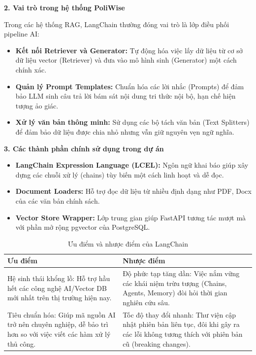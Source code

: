 \documentclass[12pt,a4paper]{report}
\begin{document}
\textbf{2. Vai trò trong hệ thống PoliWise}

Trong các hệ thống RAG, LangChain thường đóng vai trò là lớp điều phối pipeline AI:
\begin{itemize}
    \item \textbf{Kết nối Retriever và Generator:} Tự động hóa việc lấy dữ liệu từ cơ sở dữ liệu vector (Retriever) và đưa vào mô hình sinh (Generator) một cách chính xác.
    \item \textbf{Quản lý Prompt Templates:} Chuẩn hóa các lời nhắc (Prompts) để đảm bảo LLM sinh câu trả lời bám sát nội dung tri thức nội bộ, hạn chế hiện tượng ảo giác.
    \item \textbf{Xử lý văn bản thông minh:} Sử dụng các bộ tách văn bản (Text Splitters) để đảm bảo dữ liệu được chia nhỏ nhưng vẫn giữ nguyên vẹn ngữ nghĩa.
\end{itemize}

\textbf{3. Các thành phần chính sử dụng trong dự án}
\begin{itemize}
    \item \textbf{LangChain Expression Language (LCEL):} Ngôn ngữ khai báo giúp xây dựng các chuỗi xử lý (chains) tùy biến một cách linh hoạt và dễ đọc.
    \item \textbf{Document Loaders:} Hỗ trợ đọc dữ liệu từ nhiều định dạng như PDF, Docx của các văn bản chính sách.
    \item \textbf{Vector Store Wrapper:} Lớp trung gian giúp FastAPI tương tác mượt mà với phần mở rộng pgvector của PostgreSQL.
\end{itemize}

\begin{table}[H]
\centering
\caption{Ưu điểm và nhược điểm của LangChain}
\label{tab:langchain_pros_cons}
\begin{tabularx}{\textwidth}{|X|X|}
\hline
\textbf{Ưu điểm} & \textbf{Nhược điểm} \\ \hline
Hệ sinh thái khổng lồ: Hỗ trợ hầu hết các công nghệ AI/Vector DB mới nhất trên thị trường hiện nay. & Độ phức tạp tăng dần: Việc nắm vững các khái niệm trừu tượng (Chains, Agents, Memory) đòi hỏi thời gian nghiên cứu sâu. \\ \hline
Tiêu chuẩn hóa: Giúp mã nguồn AI trở nên chuyên nghiệp, dễ bảo trì hơn so với việc viết các hàm xử lý thủ công. & Tốc độ thay đổi nhanh: Thư viện cập nhật phiên bản liên tục, đôi khi gây ra các lỗi không tương thích với phiên bản cũ (breaking changes). \\ \hline
\end{tabularx}
\end{table}
\end{document}
